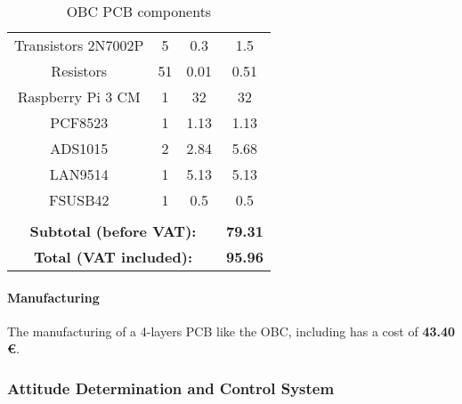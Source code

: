 \begin{appendices}
\begin{table}[H]
\begin{tabular}{@{}cccc@{}}
Transistors 2N7002P      & 5                    & 0.3                  & 1.5                  \\
Resistors                & 51                   & 0.01                 & 0.51                 \\
Raspberry Pi 3 CM        & 1                    & 32                   & 32                   \\
PCF8523                  & 1                    & 1.13                 & 1.13                 \\
ADS1015                  & 2                    & 2.84                 & 5.68                 \\
LAN9514                  & 1                    & 5.13                 & 5.13                 \\
FSUSB42                  & 1                    & 0.5                  & 0.5                  \\
\multicolumn{1}{l}{}     & \multicolumn{1}{l}{} & \multicolumn{1}{l}{} & \multicolumn{1}{l}{} \\
\multicolumn{3}{c}{\textbf{Subtotal (before VAT):}}                    & \textbf{79.31}       \\
\multicolumn{3}{c}{\textbf{Total (VAT included):}}                     & \textbf{95.96}       \\ \bottomrule
\end{tabular}
\caption{\acrshort{OBC} \acrshort{PCB} components}
\label{obcomp}
\end{table}


\paragraph{Manufacturing}

The manufacturing of a 4-layers \acrshort{PCB} like the \acrshort{OBC}, including  has a cost of \textbf{43.40 €}.

\subsubsection{Attitude Determination and Control System}

\end{appendices}
